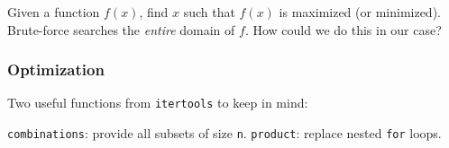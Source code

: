 \documentclass[11pt]{beamer}
\begin{document}
{ 
\begin{frame}[plain]


  \begin{enumerate}
  \myitem  Given a function $f(x)$, find $x$ such that $f(x)$ is maximized (or minimized). %
  \myitem  Brute-force searches the \emph{entire} domain of $f$. %
  \myitem  How could we do this in our case?
  \end{enumerate}
 \end{frame}
}

\begin{frame}[fragile]
  \frametitle{Optimization}
  \Enlarge

  \begin{enumerate}
  \myitem  Two useful functions from \texttt{itertools} to keep in mind:
    \begin{enumerate}
    \mysubitem  \texttt{combinations}:  provide all subsets of size \texttt{n}. %
    \mysubitem  \texttt{product}:  replace nested \texttt{for} loops.
    \end{enumerate}
  \end{enumerate}
\end{frame}
\end{document}
